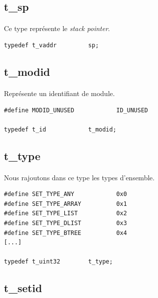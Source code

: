 \documentclass[10pt,a4wide]{article}
\begin{document}
\subsection{t\_sp}

\paragraph{}

Ce type repr\'esente le \textit{stack pointer}.

\begin{verbatim}
typedef t_vaddr         sp;
\end{verbatim}

\subsection{t\_modid}

\paragraph{}

Repr\'esente un identifiant de module.

\begin{verbatim}
#define MODID_UNUSED            ID_UNUSED

typedef t_id            t_modid;
\end{verbatim}

\subsection{t\_type}

\paragraph{}

Nous rajoutons dans ce type les types d'ensemble.

\begin{verbatim}
#define SET_TYPE_ANY            0x0
#define SET_TYPE_ARRAY          0x1
#define SET_TYPE_LIST           0x2
#define SET_TYPE_DLIST          0x3
#define SET_TYPE_BTREE          0x4
[...]

typedef t_uint32        t_type;
\end{verbatim}

\subsection{t\_setid}
\end{document}
